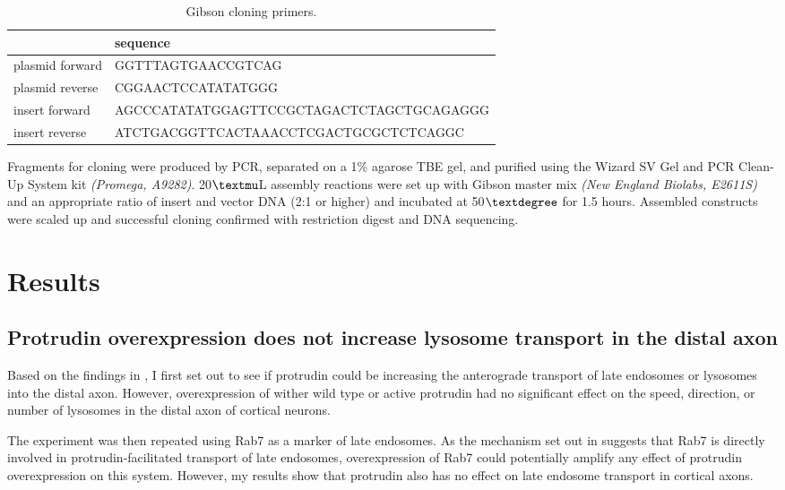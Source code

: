 \documentclass[
]{book}
\begin{document}
\begin{table}

\caption{\label{tab:primer-table}Gibson cloning primers.}
\centering
\begin{tabular}[t]{ll}
\toprule
  & sequence\\
\midrule
plasmid forward & GGTTTAGTGAACCGTCAG\\
plasmid reverse & CGGAACTCCATATATGGG\\
insert forward & AGCCCATATATGGAGTTCCGCTAGACTCTAGCTGCAGAGGG\\
insert reverse & ATCTGACGGTTCACTAAACCTCGACTGCGCTCTCAGGC\\
\bottomrule
\end{tabular}
\end{table}

Fragments for cloning were produced by PCR, separated on a 1\% agarose TBE gel, and purified using the Wizard SV Gel and PCR Clean-Up System kit \emph{(Promega, A9282)}. 20\(\textmu\)L assembly reactions were set up with Gibson master mix \emph{(New England Biolabs, E2611S)} and an appropriate ratio of insert and vector DNA (2:1 or higher) and incubated at 50\(\textdegree\) for 1.5 hours. Assembled constructs were scaled up and successful cloning confirmed with restriction digest and DNA sequencing.

\hypertarget{results}{%
\section{Results}\label{results}}

\hypertarget{protrudin-overexpression-does-not-increase-lysosome-transport-in-the-distal-axon}{%
\subsection{Protrudin overexpression does not increase lysosome transport in the distal axon}\label{protrudin-overexpression-does-not-increase-lysosome-transport-in-the-distal-axon}}

Based on the findings in \citep{raiborgRepeatedEREndosome2015}, I first set out to see if protrudin could be increasing the anterograde transport of late endosomes or lysosomes into the distal axon. However, overexpression of wither wild type or active protrudin had no significant effect on the speed, direction, or number of lysosomes in the distal axon of cortical neurons.

The experiment was then repeated using Rab7 as a marker of late endosomes. As the mechanism set out in \citep{raiborgRepeatedEREndosome2015} suggests that Rab7 is directly involved in protrudin-facilitated transport of late endosomes, overexpression of Rab7 could potentially amplify any effect of protrudin overexpression on this system. However, my results show that protrudin also has no effect on late endosome transport in cortical axons.
\end{document}
